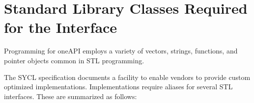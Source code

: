 \documentclass[letterpaper,10pt,english]{sphinxmanual}
\begin{document}
\section{Standard Library Classes Required for the Interface}
\label{\detokenize{language/index:standard-library-classes-required-for-the-interface}}
Programming for oneAPI employs a variety of vectors, strings, functions,
and pointer objects common in STL programming.

The SYCL specification documents a facility to enable vendors to provide
custom optimized implementations. Implementations require aliases for
several STL interfaces. These are summarized as follows:
\end{document}
